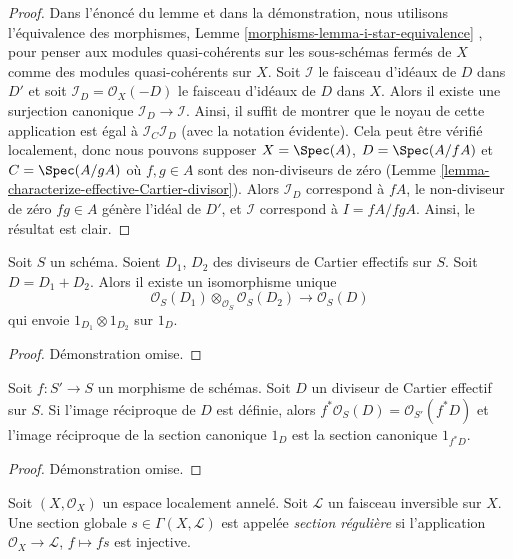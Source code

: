 \begin{proof}
Dans l'énoncé du lemme et dans la démonstration, nous utilisons l'équivalence des
morphismes, Lemme  \ref{morphisms-lemma-i-star-equivalence} , pour penser aux modules quasi-cohérents sur les
sous-schémas fermés de  $X$  comme des modules quasi-cohérents sur
 $X$. Soit  $\mathcal{I}$  le faisceau d'idéaux de  $D$  dans
 $D'$  et soit  $\mathcal{I}_D = \mathcal{O}_X(-D)$  le faisceau d'idéaux de  $D$  dans
 $X$. Alors il existe une surjection canonique  $\mathcal{I}_D \to \mathcal{I}$. Ainsi, il
suffit de montrer que le noyau de cette application est égal à  $\mathcal{I}_C\mathcal{I}_D$  (avec
la notation évidente). Cela peut être vérifié localement, donc nous pouvons
supposer  $X = \Spec(A)$,  $D = \Spec(A/fA)$  et  $C = \Spec(A/gA)$  où  $f, g \in A$  sont des
non-diviseurs de zéro (Lemme  \ref{lemma-characterize-effective-Cartier-divisor}). Alors  $\mathcal{I}_D$  correspond à
 $fA$, le non-diviseur de zéro  $fg \in A$  génère l'idéal de  $D'$,
et  $\mathcal{I}$  correspond à  $I = fA/fgA$. Ainsi, le résultat est clair.
\end{proof}

\begin{lemma}
\label{lemma-invertible-sheaf-sum-effective-Cartier-divisors}
Soit  $S$  un schéma. Soient  $D_1$,  $D_2$  des diviseurs de
Cartier effectifs sur  $S$. Soit  $D = D_1 + D_2$. Alors il existe un
isomorphisme unique
$$
\mathcal{O}_S(D_1) \otimes_{\mathcal{O}_S} \mathcal{O}_S(D_2)
\longrightarrow
\mathcal{O}_S(D)
$$
qui envoie  $1_{D_1} \otimes 1_{D_2}$  sur  $1_D$.
\end{lemma}

\begin{proof}
Démonstration omise.
\end{proof}

\begin{lemma}
\label{lemma-pullback-effective-Cartier-divisors}
Soit  $f : S' \to S$  un morphisme de schémas. Soit  $D$  un diviseur de
Cartier effectif sur  $S$. Si l'image réciproque de  $D$  est
définie, alors  $f^*\mathcal{O}_S(D) = \mathcal{O}_{S'}(f^*D)$  et l'image réciproque de la section canonique  $1_D$  est
la section canonique  $1_{f^*D}$.
\end{lemma}

\begin{proof}
Démonstration omise.
\end{proof}

\begin{definition}
\label{definition-regular-section}
Soit  $(X, \mathcal{O}_X)$  un espace localement annelé. Soit  $\mathcal{L}$  un faisceau
inversible sur  $X$. Une section globale  $s \in \Gamma(X, \mathcal{L})$  est appelée
 {\it  section régulière}  si l'application
 $\mathcal{O}_X \to \mathcal{L}$,  $f \mapsto fs$  est injective.
\end{definition}

